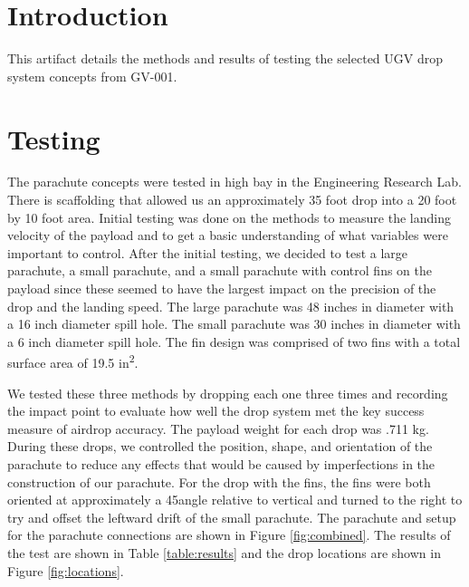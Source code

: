 \documentclass[]{auvsi_doc}
\begin{document}
\begin{AUVSITitlePage}
\begin{artifacttable}
\end{artifacttable}
\end{AUVSITitlePage}

\section{Introduction}
This artifact details the methods and results of testing the selected UGV drop system concepts from GV-001.

\section{Testing}
The parachute concepts were tested in high bay in the Engineering Research Lab. There is scaffolding that allowed us an approximately 35 foot drop into a 20 foot by 10 foot area. Initial testing was done on the methods to measure the landing velocity of the payload and to get a basic understanding of what variables were important to control. After the initial testing, we decided to test a large parachute, a small parachute, and a small parachute with control fins on the payload since these seemed to have the largest impact on the precision of the drop and the landing speed. The large parachute was 48 inches in diameter with a 16 inch diameter spill hole. The small parachute was 30 inches in diameter with a 6 inch diameter spill hole. The fin design was comprised of two fins with a total surface area of 19.5 in\textsuperscript{2}.

We tested these three methods by dropping each one three times and recording the impact point to evaluate how well the drop system met the key success measure of airdrop accuracy. The payload weight for each drop was .711 kg.  During these drops, we controlled the position, shape, and orientation of the parachute to reduce any effects that would be caused by imperfections in the construction of our parachute. For the drop with the fins, the fins were both oriented at approximately a 45\degree angle relative to vertical and turned to the right to try and offset the leftward drift of the small parachute. The parachute and setup for the parachute connections are shown in Figure \ref{fig:combined}. The results of the test are shown in Table \ref{table:results} and the drop locations are shown in Figure \ref{fig:locations}.
\end{document}

